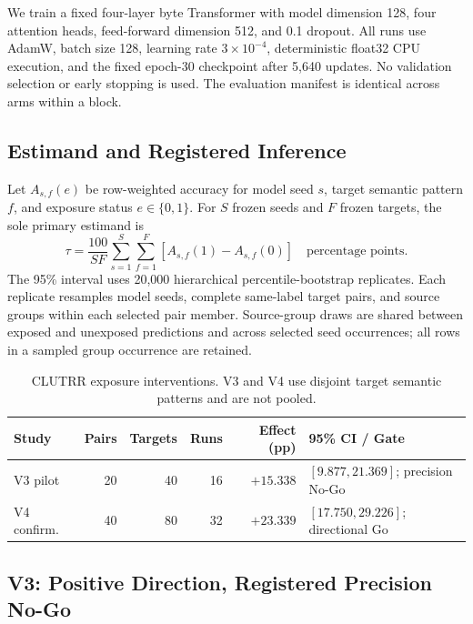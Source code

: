 We train a fixed four-layer byte Transformer with model dimension 128, four
attention heads, feed-forward dimension 512, and 0.1 dropout.  All runs use
AdamW, batch size 128, learning rate $3\times10^{-4}$, deterministic
float32 CPU execution, and the fixed epoch-30 checkpoint after 5,640 updates.
No validation selection or early stopping is used.  The evaluation manifest
is identical across arms within a block.

\subsection{Estimand and Registered Inference}

Let $A_{s,f}(e)$ be row-weighted accuracy for model seed $s$, target semantic
pattern $f$, and exposure status $e\in\{0,1\}$.  For $S$ frozen seeds and
$F$ frozen targets, the sole primary estimand is
\begin{equation}
\tau
=
\frac{100}{SF}
\sum_{s=1}^{S}\sum_{f=1}^{F}
\left[A_{s,f}(1)-A_{s,f}(0)\right]
\quad\text{percentage points}.
\label{eq:clutrr-exposure-estimand}
\end{equation}
The 95\% interval uses 20,000 hierarchical percentile-bootstrap replicates.
Each replicate resamples model seeds, complete same-label target pairs, and
source groups within each selected pair member.  Source-group draws are shared
between exposed and unexposed predictions and across selected seed
occurrences; all rows in a sampled group occurrence are retained.

\begin{table}[t]
\centering
\small
\setlength{\tabcolsep}{4pt}
\begin{tabular}{lrrrrl}
\toprule
Study & Pairs & Targets & Runs & Effect (pp) & 95\% CI / Gate \\
\midrule
V3 pilot & 20 & 40 & 16 & $+15.338$ &
$[9.877,21.369]$; precision No-Go \\
V4 confirm. & 40 & 80 & 32 & $+23.339$ &
$[17.750,29.226]$; directional Go \\
\bottomrule
\end{tabular}
\caption{CLUTRR exposure interventions.  V3 and V4 use disjoint target
semantic patterns and are not pooled.}
\label{tab:clutrr-external-validation}
\end{table}

\subsection{V3: Positive Direction, Registered Precision No-Go}

